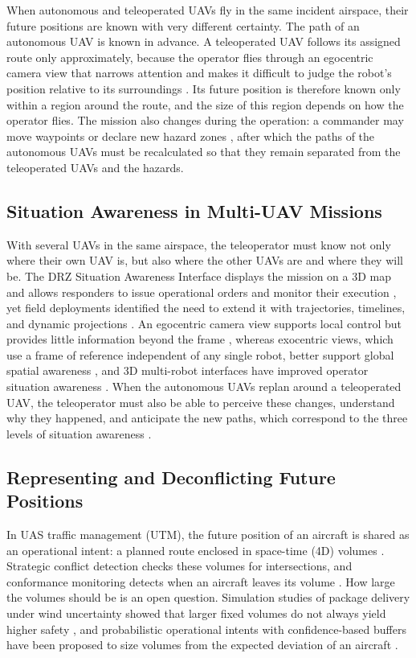 \documentclass{article}
\begin{document}
When autonomous and teleoperated UAVs fly in the same incident airspace, their future positions are known with very different certainty.
The path of an autonomous UAV is known in advance.
A teleoperated UAV follows its assigned route only approximately, because the operator flies through an egocentric camera view that narrows attention and makes it difficult to judge the robot's position relative to its surroundings \cite{thomas2001, hollands2011}.
Its future position is therefore known only within a region around the route, and the size of this region depends on how the operator flies.
The mission also changes during the operation: a commander may move waypoints or declare new hazard zones \cite{kruijff2021}, after which the paths of the autonomous UAVs must be recalculated so that they remain separated from the teleoperated UAVs and the hazards.

\subsection{Situation Awareness in Multi-UAV Missions}
With several UAVs in the same airspace, the teleoperator must know not only where their own UAV is, but also where the other UAVs are and where they will be.
The DRZ Situation Awareness Interface displays the mission on a 3D map and allows responders to issue operational orders and monitor their execution \cite{kruijff2021}, yet field deployments identified the need to extend it with trajectories, timelines, and dynamic projections \cite{surmann2024}.
An egocentric camera view supports local control but provides little information beyond the frame \cite{thomas2001, hollands2011}, whereas exocentric views, which use a frame of reference independent of any single robot, better support global spatial awareness \cite{pavlovic2009}, and 3D multi-robot interfaces have improved operator situation awareness \cite{roldan2017}.
When the autonomous UAVs replan around a teleoperated UAV, the teleoperator must also be able to perceive these changes, understand why they happened, and anticipate the new paths, which correspond to the three levels of situation awareness \cite{endsley1995}.

\subsection{Representing and Deconflicting Future Positions}
In UAS traffic management (UTM), the future position of an aircraft is shared as an operational intent: a planned route enclosed in space-time (4D) volumes \cite{astmf3548}.
Strategic conflict detection checks these volumes for intersections, and conformance monitoring detects when an aircraft leaves its volume \cite{astmf3548, dai2023conformance}.
How large the volumes should be is an open question.
Simulation studies of package delivery under wind uncertainty showed that larger fixed volumes do not always yield higher safety \cite{pradeep2025wind}, and probabilistic operational intents with confidence-based buffers have been proposed to size volumes from the expected deviation of an aircraft \cite{cardenas2024confidence}.
\end{document}
